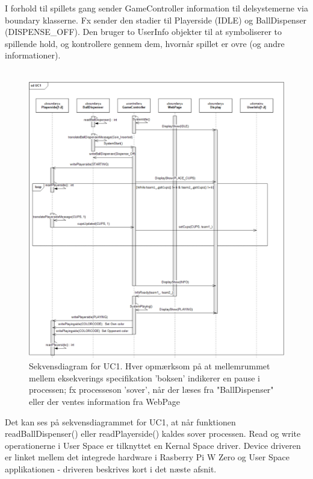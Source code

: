 \documentclass[Rapport/Rapport_main.tex]{subfiles}
\begin{document}
I forhold til spillets gang sender GameController information til delsystemerne via boundary klasserne. Fx sender den stadier til Playerside (IDLE) og BallDispenser (DISPENSE\_OFF). Den bruger to UserInfo objekter til at symboliserer to spillende hold, og kontrollere gennem dem, hvornår spillet er ovre (og andre informationer). \\\\
\begin{figure}[H]
    \centering
    \includegraphics[width=\textwidth]{Arkitektur/Softwarearkitektur/Applikationsmodel/RPi/graphics_RPi/UC1_SD.png}
    \caption{Sekvensdiagram for UC1. Hver opmærksom på at mellemrummet mellem eksekverings specifikation 'boksen' indikerer en pause i processen; fx processeson 'sover', når der læses fra "BallDispenser" eller der ventes information fra WebPage}
    \label{fig:UC1_SD_RPi_RAP}
\end{figure}
Det kan ses på sekvensdiagrammet for UC1, at når funktionen readBallDispenser() eller readPlayerside() kaldes sover processen. Read og write operationerne i User Space er tilknyttet en Kernal Space driver. Device driveren er linket mellem det integrede hardware i Rasberry Pi W Zero og User Space applikationen - driveren beskrives kort i det næste afsnit. 
\end{document}

